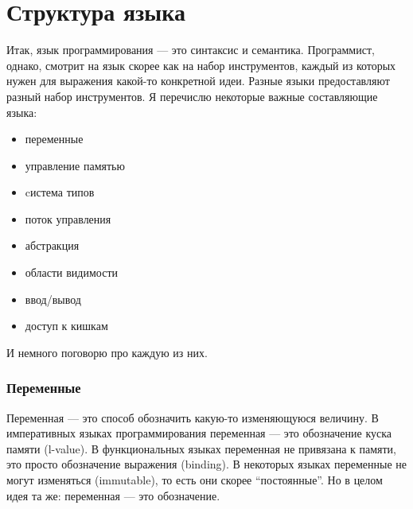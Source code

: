 \documentclass[11pt]{book}
\begin{document}
\section{Структура языка}
Итак, язык программирования --- это синтаксис и семантика.
Программист, однако, смотрит на язык скорее как на набор инструментов, каждый из которых нужен для выражения какой-то конкретной идеи.
Разные языки предоставляют разный набор инструментов.
Я перечислю некоторые важные составляющие языка:
\begin{itemize}
\item переменные
\item управление памятью
\item cистема типов
\item поток управления
\item абстракция
\item области видимости
\item ввод/вывод
\item доступ к кишкам
\end{itemize}
И немного поговорю про каждую из них.

\subsubsection{Переменные}
Переменная --- это способ обозначить какую-то изменяющуюся величину.
В императивных языках программирования переменная --- это обозначение куска памяти (l-value).
В функциональных языках переменная не привязана к памяти, это просто обозначение выражения (binding).
В некоторых языках переменные не могут изменяться (immutable), то есть они скорее ``постоянные''.
Но в целом идея та же: переменная --- это обозначение.
\end{document}

